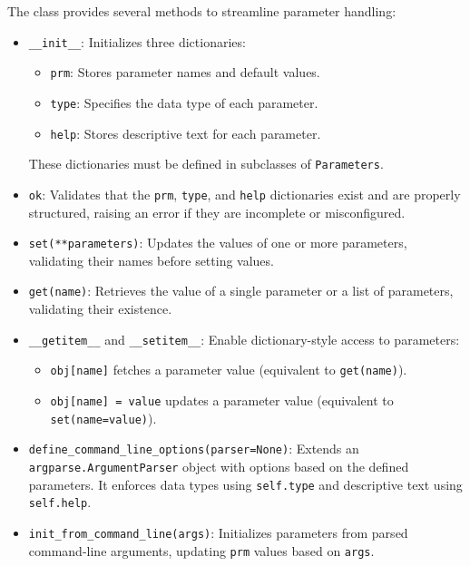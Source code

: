 \documentclass{article}
\begin{document}
		The class provides several methods to streamline parameter handling:
		
		\begin{itemize}
			\item \texttt{\_\_init\_\_}: Initializes three dictionaries:
			\begin{itemize}
				\item \texttt{prm}: Stores parameter names and default values.
				\item \texttt{type}: Specifies the data type of each parameter.
				\item \texttt{help}: Stores descriptive text for each parameter.
			\end{itemize}
			These dictionaries must be defined in subclasses of \texttt{Parameters}.
			
			\item \texttt{ok}: Validates that the \texttt{prm}, \texttt{type}, and \texttt{help} dictionaries exist and are properly structured, raising an error if they are incomplete or misconfigured.
			
			\item \texttt{set(**parameters)}: Updates the values of one or more parameters, validating their names before setting values.
			
			\item \texttt{get(name)}: Retrieves the value of a single parameter or a list of parameters, validating their existence.
			
			\item \texttt{\_\_getitem\_\_} and \texttt{\_\_setitem\_\_}: Enable dictionary-style access to parameters:
			\begin{itemize}
				\item \texttt{obj[name]} fetches a parameter value (equivalent to \texttt{get(name)}).
				\item \texttt{obj[name] = value} updates a parameter value (equivalent to \texttt{set(name=value)}).
			\end{itemize}
			
			\item \texttt{define\_command\_line\_options(parser=None)}: Extends an \texttt{argparse.ArgumentParser} object with options based on the defined parameters. It enforces data types using \texttt{self.type} and descriptive text using \texttt{self.help}.
			
			\item \texttt{init\_from\_command\_line(args)}: Initializes parameters from parsed command-line arguments, updating \texttt{prm} values based on \texttt{args}.
		\end{itemize}
		
\end{document}

